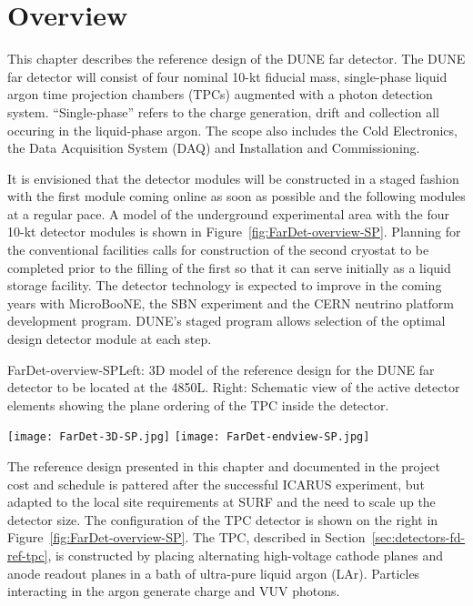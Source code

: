 \section{Overview}
\label{sec:detectors-fd-ref-ov}


This chapter describes the reference design of the DUNE far detector. The DUNE far detector will consist of four nominal 10-kt fiducial mass, single-phase liquid argon time projection chambers (TPCs) augmented with a photon detection system.  ``Single-phase'' refers to the charge generation, drift and collection all occuring in the liquid-phase argon. 
The scope also includes the Cold Electronics, the Data Acquisition System (DAQ) and Installation and Commissioning.

It is envisioned that the detector modules will be constructed in a staged fashion with the first module coming online as soon as possible and the following modules at a regular pace. A model of the underground experimental area with the four 10-kt detector modules is shown in Figure~\ref{fig:FarDet-overview-SP}. Planning for the conventional facilities calls for construction of the second cryostat to be completed prior to the filling of the first so that it can serve initially as a liquid storage facility. 
The detector technology is expected to improve in the coming years with MicroBooNE, the SBN experiment and the CERN neutrino platform development program. DUNE's staged program allows selection of the optimal design detector module at each step. 

\begin{cdrfigure}{FarDet-overview-SP}{Left: 3D model of the reference design for the DUNE far detector to be located at the 4850L. Right: Schematic view of the active detector elements showing the plane ordering of the TPC inside the detector.}
\centering
\begin{minipage}[b]{1.0\textwidth}
\begin{center}
\texttt{[image: FarDet-3D-SP.jpg]}
\texttt{[image: FarDet-endview-SP.jpg]}
\end{center}
\end{minipage}
\end{cdrfigure}

The reference design presented in this chapter and documented in the project cost and schedule is %
pattered after the successful ICARUS experiment, but adapted to the local site requirements at SURF and the need to scale up the detector size. The configuration of the TPC detector is shown on the right in Figure~\ref{fig:FarDet-overview-SP}.  The TPC, described in Section~\ref{sec:detectors-fd-ref-tpc}, is constructed by placing alternating high-voltage cathode planes and anode readout planes in a bath of ultra-pure liquid argon (LAr). Particles interacting in the argon generate charge and VUV photons. 

